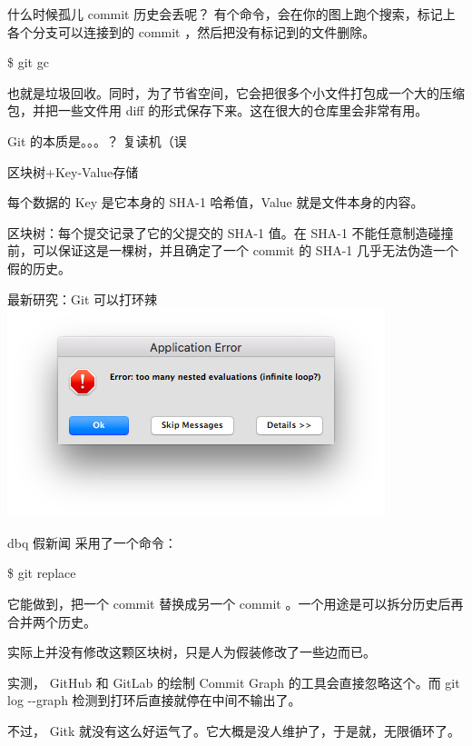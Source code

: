 \documentclass{beamer}
\begin{document}
\begin{frame}{什么时候孤儿 commit 历史会丢呢？}
    有个命令，会在你的图上跑个搜索，标记上各个分支可以连接到的 commit ，然后把没有标记到的文件删除。

    \$ git gc

    也就是垃圾回收。同时，为了节省空间，它会把很多个小文件打包成一个大的压缩包，并把一些文件用 diff 的形式保存下来。这在很大的仓库里会非常有用。
\end{frame}

\begin{frame}{Git 的本质是。。。？}
    复读机（误

    区块树+Key-Value存储

    每个数据的 Key 是它本身的 SHA-1 哈希值，Value 就是文件本身的内容。

    区块树：每个提交记录了它的父提交的 SHA-1 值。在 SHA-1 不能任意制造碰撞前，可以保证这是一棵树，并且确定了一个 commit 的 SHA-1 几乎无法伪造一个假的历史。
\end{frame}

\begin{frame}{最新研究：Git 可以打环辣}
    \includegraphics[width=\linewidth]{2018-10-26-23-52-53.png}
\end{frame}

\begin{frame}{dbq 假新闻}
    采用了一个命令：

    \$ git replace

    它能做到，把一个 commit 替换成另一个 commit 。一个用途是可以拆分历史后再合并两个历史。

    实际上并没有修改这颗区块树，只是人为假装修改了一些边而已。

    实测， GitHub 和 GitLab 的绘制 Commit Graph 的工具会直接忽略这个。而 git log -{}-graph 检测到打环后直接就停在中间不输出了。

    不过， Gitk 就没有这么好运气了。它大概是没人维护了，于是就，无限循环了。
\end{frame}
\end{document}
